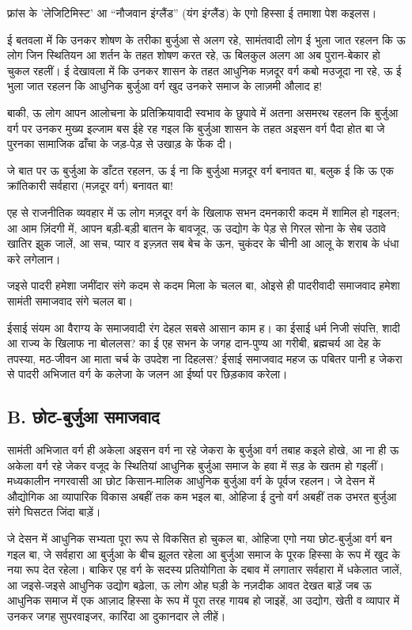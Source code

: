 \documentclass[12pt,a4paper,oneside]{book}
\begin{document}
फ्रांस के 'लेजिटिमिस्ट' आ “नौजवान इंग्लैंड” (यंग इंग्लैंड) के एगो हिस्सा ई तमाशा पेश कइलस।

ई बतवला में कि उनकर शोषण के तरीका बुर्जुआ से अलग रहे, सामंतवादी लोग ई भुला जात रहलन कि ऊ लोग जिन स्थितियन आ शर्तन के तहत शोषण करत रहे, ऊ बिलकुल अलग आ अब पुरान-बेकार हो चुकल रहलीं। ई देखावला में कि उनकर शासन के तहत आधुनिक मज़दूर वर्ग कबो मउजूदा ना रहे, ऊ ई भुला जात रहलन कि आधुनिक बुर्जुआ वर्ग खुद उनकरे समाज के लाज़मी औलाद ह!

बाकी, ऊ लोग आपन आलोचना के प्रतिक्रियावादी स्वभाव के छुपावे में अतना असमरथ रहलन कि बुर्जुआ वर्ग पर उनकर मुख्य इल्जाम बस ईहे रह गइल कि बुर्जुआ शासन के तहत अइसन वर्ग पैदा होत बा जे पुरनका सामाजिक ढाँचा के जड़-पेड़ से उखाड़ के फेंक दी।

जे बात पर ऊ बुर्जुआ के डाँटत रहलन, ऊ ई ना कि बुर्जुआ मज़दूर वर्ग बनावत बा, बलुक ई कि ऊ एक क्रांतिकारी सर्वहारा (मज़दूर वर्ग) बनावत बा!

एह से राजनीतिक व्यवहार में ऊ लोग मज़दूर वर्ग के खिलाफ सभन दमनकारी कदम में शामिल हो गइलन; आ आम ज़िंदगी में, आपन बड़ी-बड़ी बातन के बावजूद, ऊ उद्योग के पेड़ से गिरल सोना के सेब उठावे खातिर झुक जालें, आ सच, प्यार व इज़्ज़त सब बेच के ऊन, चुकंदर के चीनी आ आलू के शराब के धंधा करे लगेलान।

जइसे पादरी हमेशा जमींदार संगे कदम से कदम मिला के चलल बा, ओइसे ही पादरीवादी समाजवाद हमेशा सामंती समाजवाद संगे चलल बा।

ईसाई संयम आ वैराग्य के समाजवादी रंग देहल सबसे आसान काम ह। का ईसाई धर्म निजी संपत्ति, शादी आ राज्य के खिलाफ ना बोललस? का ई एह सभन के जगह दान-पुण्य आ गरीबी, ब्रह्मचर्य आ देह के तपस्या, मठ-जीवन आ माता चर्च के उपदेश ना दिहलस? ईसाई समाजवाद महज ऊ पबितर पानी ह जेकरा से पादरी अभिजात वर्ग के कलेजा के जलन आ ईर्ष्या पर छिड़काव करेला।


\subsection*{{\engfont B}. छोट-बुर्जुआ समाजवाद}
सामंती अभिजात वर्ग ही अकेला अइसन वर्ग ना रहे जेकरा के बुर्जुआ वर्ग तबाह कइले होखे, आ ना ही ऊ अकेला वर्ग रहे जेकर वजूद के स्थितियां आधुनिक बुर्जुआ समाज के हवा में सड़ के खतम हो गइलीं। मध्यकालीन नगरवासी आ छोट किसान-मालिक आधुनिक बुर्जुआ वर्ग के पूर्वज रहलन। जे देसन में औद्योगिक आ व्यापारिक विकास अबहीं तक कम भइल बा, ओहिजा ई दुनो वर्ग अबहीं तक उभरत बुर्जुआ संगे घिसटत जिंदा बाड़ें।

जे देसन में आधुनिक सभ्यता पूरा रूप से विकसित हो चुकल बा, ओहिजा एगो नया छोट-बुर्जुआ वर्ग बन गइल बा, जे सर्वहारा आ बुर्जुआ के बीच झूलत रहेला आ बुर्जुआ समाज के पूरक हिस्सा के रूप में खुद के नया रूप देत रहेला। बाकिर एह वर्ग के सदस्य प्रतियोगिता के दबाव में लगातार सर्वहारा में धकेलात जालें, आ जइसे-जइसे आधुनिक उद्योग बढ़ेला, ऊ लोग ओह घड़ी के नज़दीक आवत देखत बाड़ें जब ऊ आधुनिक समाज में एक आज़ाद हिस्सा के रूप में पूरा तरह गायब हो जाइहें, आ उद्योग, खेती व व्यापार में उनकर जगह सुपरवाइजर, कारिंदा आ दुकानदार ले लीहें।
\end{document}
